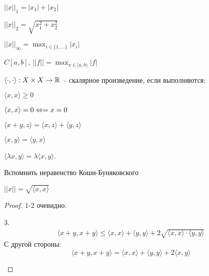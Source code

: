     \begin{Example}
        $||x||_1 = |x_1| + |x_2|$
    \end{Example}

    \begin{Example}
        $||x||_2 = \sqrt{x_1^2 + x_2^2}$ 
    \end{Example}

    \begin{Example}
        $||x||_\infty = \max_{i \in \{1, ...\}} |x_i|$
    \end{Example}

    \begin{Example}
        $C[a, b]$, $||f|| = \max_{x \in [a, b)} |f|$ 
    \end{Example}

    \begin{Def}
        $\langle \cdot, \cdot \rangle : X \times X \to \mathbb{R}$ -- скалярное произведение, если выполняются:
        \begin{MyList}
            \item $\langle x, x\rangle \geqslant 0$ 
            \item[] $\langle x, x\rangle = 0 \Leftrightarrow = x = 0$
            \item $\langle x + y, z\rangle = \langle x, z\rangle + \langle y, z\rangle$
            \item $\langle x, y\rangle = \langle y, x\rangle$
            \item $\langle \lambda x, y\rangle = \lambda \langle x, y\rangle$. 
        \end{MyList} 
    \end{Def}

    \begin{Ex}
        Вспомнить неравенство Коши-Буняковского
    \end{Ex}

    \begin{Prop}
        $||x|| = \sqrt{\langle x, x\rangle}$
    \end{Prop}

    \begin{proof}
        1-2 очевидно.
        \begin{MyList}
            \item[3.]
            \begin{align*}
                \langle x + y, x + y \rangle \leqslant \langle x, x\rangle + \langle y, y\rangle + 2\sqrt{\langle x, x\rangle \cdot \langle y, y\rangle}
            \end{align*}
            С другой стороны:
            \[\langle x + y, x + y \rangle = \langle x, x\rangle + \langle y, y\rangle + 2 \langle x, y\rangle\]
        \end{MyList}
    \end{proof}

